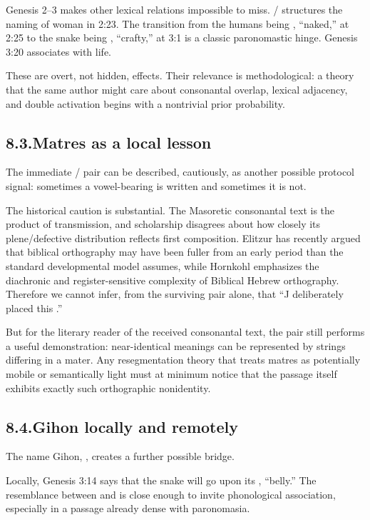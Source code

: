 Genesis 2--3 makes other lexical relations impossible to miss.  / structures the naming of woman in 2:23.  The transition from the humans being , ``naked,'' at 2:25 to the snake being , ``crafty,'' at 3:1 is a classic paronomastic hinge.\cite{WaltkeOConnor1990,Westermann1984}  Genesis 3:20 associates  with life.

These are overt, not hidden, effects.  Their relevance is methodological: a theory that the same author might care about consonantal overlap, lexical adjacency, and double activation begins with a nontrivial prior probability.

\subsection*{8.3.\quad Matres as a local lesson}

The immediate / pair can be described, cautiously, as another possible protocol signal: sometimes a vowel-bearing  is written and sometimes it is not.

The historical caution is substantial.  The Masoretic consonantal text is the product of transmission, and scholarship disagrees about how closely its plene/defective distribution reflects first composition.  Elitzur has recently argued that biblical orthography may have been fuller from an early period than the standard developmental model assumes, while Hornkohl emphasizes the diachronic and register-sensitive complexity of Biblical Hebrew orthography.\cite{Elitzur2023,Hornkohl2024}  Therefore we cannot infer, from the surviving pair alone, that ``J deliberately placed this .''

But for the literary reader of the received consonantal text, the pair still performs a useful demonstration: near-identical meanings can be represented by strings differing in a mater.  Any resegmentation theory that treats matres as potentially mobile or semantically light must at minimum notice that the passage itself exhibits exactly such orthographic nonidentity.

\subsection*{8.4.\quad Gihon locally and remotely}

The name Gihon, , creates a further possible bridge.

Locally, Genesis 3:14 says that the snake will go upon its , ``belly.''  The resemblance between  and  is close enough to invite phonological association, especially in a passage already dense with paronomasia.

